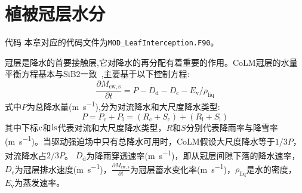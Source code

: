 
\chapter{植被冠层水分}\label{植被冠层截留}

\begin{mymdframed}{代码}
  本章对应的代码文件为\texttt{MOD\_LeafInterception.F90}。
\end{mymdframed}

冠层是降水的首要接触层,它对降水的再分配有着重要的作用。CoLM冠层的水量平衡方程基本与SiB2一致~\citep{sellers1996revised},主要基于以下控制方程:
\begin{equation}\label{eq:冠层水量控制方程}
  \frac{\partial M_{\mathrm{cw,s}}}{\partial t} = P-D_{\mathrm{d}}-D_{\mathrm{c}}-E_{\mathrm{v}} / \rho_{\mathrm{liq}}
\end{equation}
式中$P$为总降水量(\unit{m.s^{-1}}),分为对流降水和大尺度降水类型:
\begin{equation}\label{eq:降水类型}
  P=P_{\mathrm{c}}+P_{\mathrm{l}}=\left(R_{\mathrm{c}}+S_{\mathrm{c}}\right)+\left(R_{\mathrm{l}}+S_{\mathrm{l}}\right)
\end{equation}
其中下标$\rm c$和$\rm ls$代表对流和大尺度降水类型，$R$和$S$分别代表降雨率与降雪率(\unit{m.s^{-1}})。当驱动强迫场中只有总降水可用时，CoLM假设大尺度降水等于$1/3P$，对流降水占$2/3P$。
$D_{\mathrm {d}} $为降雨穿透速率(\unit{m.s^{-1}})，即从冠层间隙下落的降水速率，$D_{\mathrm {c}} $为冠层排水速度(\unit{m.s^{-1}})，$\frac{\partial M_{\mathrm{cw,s}}}{\partial t}$为冠层蓄水变化率(\unit{m.s^{-1}})，$\rho_{\mathrm {liq}} $是水的密度，$E_{\mathrm{v}}$为蒸发速率。

